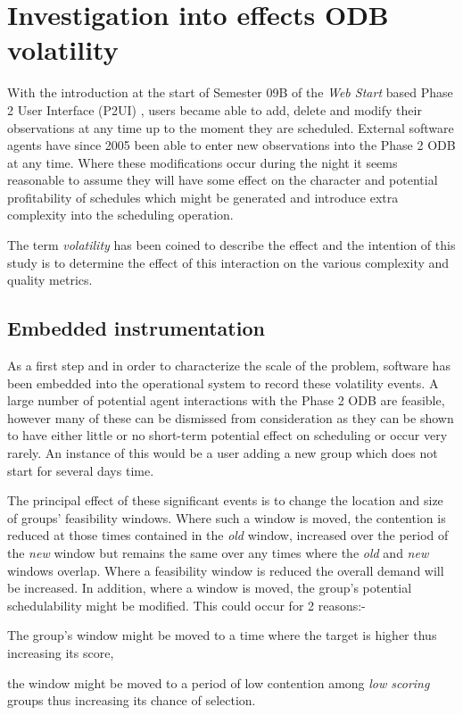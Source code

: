 \section{Investigation into effects ODB volatility}
\label{sect:exp_volatility}

With the introduction at the start of Semester 09B of the \emph{Web Start} based Phase 2 User Interface (P2UI) \citep{smith10switching}, users became able to add, delete and modify their observations at any time up to the moment they are scheduled. External software agents \citep{allan06estar, naylor06hetero} have since 2005 been able to enter new observations into the Phase 2 ODB at any time. Where these modifications occur during the night it seems reasonable to assume they will have some effect on the character and potential profitability of schedules which might be generated and introduce extra complexity into the scheduling operation.


The term \emph{volatility} has been coined to describe the effect and the intention of this study is to determine the effect of this interaction on the various complexity and quality metrics.

\subsection{Embedded instrumentation}
As a first step and in order to characterize the scale of the problem, software has been embedded into the operational system to record these volatility events. A large number of potential agent interactions with the Phase 2 ODB are feasible, however many of these can be dismissed from consideration as they can be shown to have either little or no short-term potential effect on scheduling or occur very rarely. An instance of this would be a user adding a new group which does not start for several days time.

The principal effect of these significant events is to change the location and size of groups' feasibility windows. Where such a window is moved, the contention is reduced at those times contained in the \emph{old} window, increased over the period of the \emph{new} window but remains the same over any times where the \emph{old} and \emph{new} windows overlap. Where a feasibility window is reduced the overall demand will be increased. In addition, where a window is moved, the group's potential schedulability might be modified. This could occur for 2 reasons:- \begin{inparaenum} \item The group's window might be moved to a time where the target is higher thus increasing its score, \item the window might be moved to a period of low contention among \emph{low scoring} groups thus increasing its chance of selection.\end{inparaenum}


